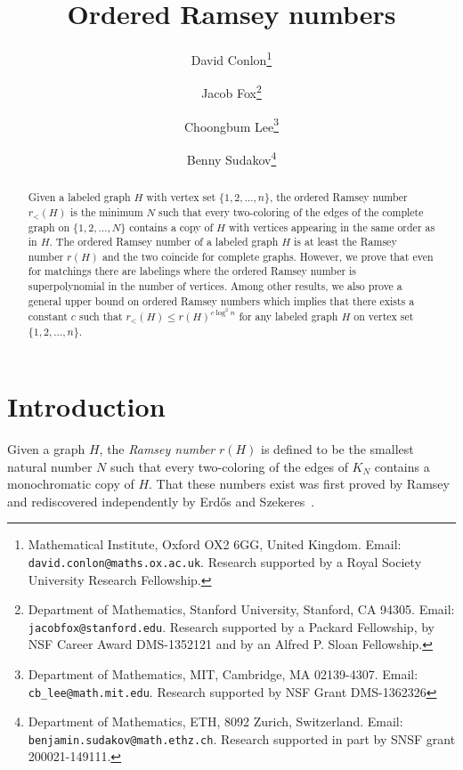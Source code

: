 \documentclass[11pt]{article}
\newcommand{\rord}{r_{<}}
\begin{document}
\title{Ordered Ramsey numbers}
\author{David Conlon\thanks{Mathematical Institute, Oxford OX2 6GG,
United Kingdom. Email: {\tt david.conlon@maths.ox.ac.uk}. Research
supported by a Royal Society University Research Fellowship.}\and
Jacob Fox\thanks{Department of Mathematics, Stanford University, Stanford, CA 94305. Email: {\tt jacobfox@stanford.edu}. Research supported by a Packard Fellowship, by NSF Career Award DMS-1352121 and by an Alfred P. Sloan Fellowship.}
\and Choongbum Lee\thanks{Department of Mathematics, MIT, Cambridge, MA
02139-4307. Email: {\tt cb\_lee@math.mit.edu}. Research supported by NSF Grant DMS-1362326}
\and
Benny Sudakov\thanks{Department of Mathematics, ETH, 8092 Zurich, Switzerland.
Email: {\tt benjamin.sudakov@math.ethz.ch}. Research supported
in part by SNSF grant 200021-149111.}}

\date{}

\maketitle

\begin{abstract}
Given a labeled graph $H$ with vertex set $\{1, 2,\ldots,n\}$, the ordered Ramsey number $\rord(H)$ is the minimum $N$ such that every two-coloring of the edges of the complete graph on $\{1, 2, \ldots,N\}$ contains a copy of $H$ with vertices appearing in the same order as in $H$. The ordered Ramsey number of a labeled graph $H$ is at least the Ramsey number $r(H)$ and the two coincide for complete graphs. However, we prove that even for matchings there are labelings where the ordered Ramsey number is superpolynomial in the number of vertices. Among other results, we also prove a general upper bound on ordered Ramsey numbers which implies that there exists a constant $c$ such that $\rord(H) \leq r(H)^{c \log^2 n}$ for any labeled graph $H$ on vertex set $\{1,2, \dots, n\}$. 
\end{abstract}


\section{Introduction} 

Given a graph $H$, the {\it Ramsey number} $r(H)$ is defined to be the smallest natural number $N$ such
that every two-coloring of the edges of $K_N$ contains a monochromatic copy of $H$. That these
numbers exist was first proved by Ramsey~\cite{R30} and rediscovered independently by Erd\H{o}s and Szekeres~\cite{ES35}. 
\end{document}
